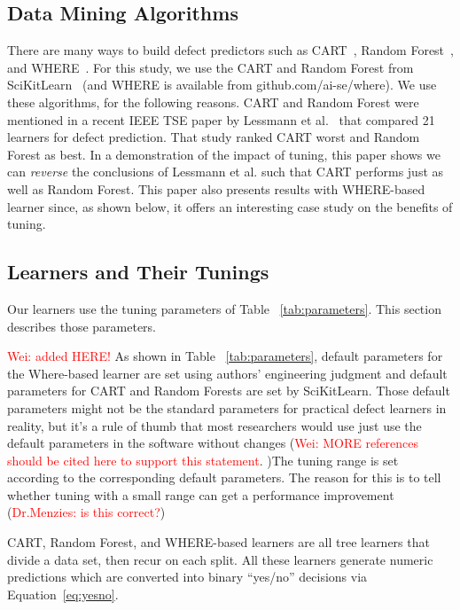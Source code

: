 \documentclass{sig-alternative}
\newcommand{\wei}[1]{\textcolor{red}{Wei: #1}}
\newcommand{\Menzies}[1]{\textcolor{red}{Dr.Menzies: #1}}
\newcommand{\tab}[1]{Table ~\ref{tab:#1}}
\newcommand{\eq}[1]{Equation~\ref{eq:#1}}
\begin{document}
\subsection{Data Mining Algorithms}
 
There are many ways to build defect predictors
such as  CART~\cite{brieman00}, Random Forest~\cite{breiman84}, 
and WHERE~\cite{menzies2013local}.
For this study, we use the CART and Random Forest  from 
SciKitLearn~\cite{scikit-learn} (and
WHERE is available from
github.com/ai-se/where).
 We use  these algorithms, for the following reasons.
CART and Random Forest were mentioned in
a recent IEEE TSE paper by Lessmann et al.~\cite{lessmann2008benchmarking} that compared 21  
learners for  defect prediction.
That study ranked  CART  worst  and Random Forest as best.
In a demonstration of the impact of tuning,
this paper shows  we can {\em reverse} the conclusions of  Lessmann et al. such that CART
performs just as well as
 Random Forest.
This
 paper also presents results with WHERE-based learner since, as shown below,
it offers an interesting case study on the benefits of tuning.
  

\subsection{Learners and Their Tunings}


Our learners use the tuning parameters of \tab{parameters}. This section describes those parameters.

\wei{added HERE!} As shown in \tab{parameters}, default parameters for the Where-based learner are set using authors' engineering judgment and default parameters for CART and Random Forests are set by SciKitLearn. Those default parameters might not be the standard parameters for practical defect learners in reality, but it's a rule of thumb that most researchers would use just use the default parameters in the software without changes\cite{me07b} (\wei{MORE references should be cited here to support this statement}. )The tuning range is set according to the corresponding default parameters. The reason for this is to tell whether tuning with a small range can get a performance improvement (\Menzies{is this correct?})


CART, Random Forest, and WHERE-based learners are all  tree learners that divide a data set, then recur
on each split.
All these learners
generate numeric predictions which are converted
into binary ``yes/no'' decisions via \eq{yesno}.
\end{document}
